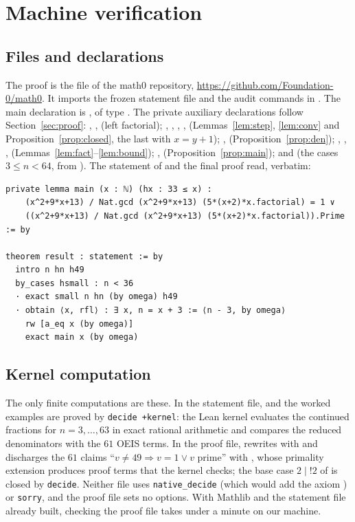 \documentclass[11pt]{amsart}
\theoremstyle{plain}
\theoremstyle{definition}
\newcommand{\lf}{\mathop{!}}
\begin{document}
\section{Machine verification}\label{sec:lean}

\subsection*{Files and declarations}
The proof is the file  of the math0 repository, \url{https://github.com/Foundation-0/math0}. It imports the frozen statement file and the audit commands in . The main declaration is , of type . The private auxiliary declarations follow Section~\ref{sec:proof}: , ,  (left factorial); , , , ,  (Lemmas~\ref{lem:step}, \ref{lem:conv} and Proposition~\ref{prop:closed}, the last with $x=y+1$); ,  (Proposition~\ref{prop:den}); , , ,  (Lemmas~\ref{lem:fact}--\ref{lem:bound}); ,  (Proposition~\ref{prop:main}); and  (the cases $3\le n<64$, from ). The statement of  and the final proof read, verbatim:
\begin{lstlisting}
private lemma main (x : ℕ) (hx : 33 ≤ x) :
    (x^2+9*x+13) / Nat.gcd (x^2+9*x+13) (5*(x+2)*x.factorial) = 1 ∨
    ((x^2+9*x+13) / Nat.gcd (x^2+9*x+13) (5*(x+2)*x.factorial)).Prime := by

theorem result : statement := by
  intro n hn h49
  by_cases hsmall : n < 36
  · exact small n hn (by omega) h49
  · obtain ⟨x, rfl⟩ : ∃ x, n = x + 3 := ⟨n - 3, by omega⟩
    rw [a_eq x (by omega)]
    exact main x (by omega)
\end{lstlisting}

\subsection*{Kernel computation}
The only finite computations are these. In the statement file,  and the worked examples are proved by \texttt{decide +kernel}: the Lean kernel evaluates the continued fractions for $n=3,\dots,63$ in exact rational arithmetic and compares the reduced denominators with the $61$ OEIS terms. In the proof file,  rewrites with  and discharges the $61$ claims ``$v\ne49\Rightarrow v=1\lor v$ prime'' with , whose primality extension produces proof terms that the kernel checks; the base case $2\mid\lf2$ of  is closed by \texttt{decide}. Neither file uses \texttt{native\_decide} (which would add the axiom ) or \texttt{sorry}, and the proof file sets no options. With Mathlib and the statement file already built, checking the proof file takes under a minute on our machine.
\end{document}
